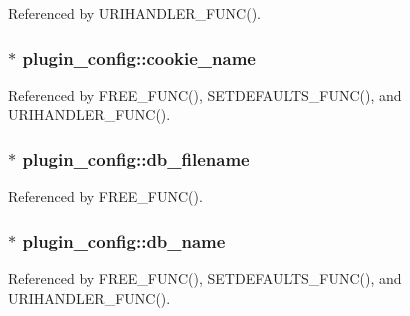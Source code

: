 Referenced by U\-R\-I\-H\-A\-N\-D\-L\-E\-R\-\_\-\-F\-U\-N\-C().

\hypertarget{structplugin__config_a32aab911a89b50b49652cfc7adcebb3c}{
\subsubsection[{cookie\-\_\-name}]{$\ast$ plugin\-\_\-config\-::cookie\-\_\-name}}\label{structplugin__config_a32aab911a89b50b49652cfc7adcebb3c}


Referenced by F\-R\-E\-E\-\_\-\-F\-U\-N\-C(), S\-E\-T\-D\-E\-F\-A\-U\-L\-T\-S\-\_\-\-F\-U\-N\-C(), and U\-R\-I\-H\-A\-N\-D\-L\-E\-R\-\_\-\-F\-U\-N\-C().

\hypertarget{structplugin__config_ad9b213b7075614a9e16ea2fe01616417}{
\subsubsection[{db\-\_\-filename}]{$\ast$ plugin\-\_\-config\-::db\-\_\-filename}}\label{structplugin__config_ad9b213b7075614a9e16ea2fe01616417}


Referenced by F\-R\-E\-E\-\_\-\-F\-U\-N\-C().

\hypertarget{structplugin__config_a4ce145b0e0b00606d2a9c8e785aaf847}{
\subsubsection[{db\-\_\-name}]{$\ast$ plugin\-\_\-config\-::db\-\_\-name}}\label{structplugin__config_a4ce145b0e0b00606d2a9c8e785aaf847}


Referenced by F\-R\-E\-E\-\_\-\-F\-U\-N\-C(), S\-E\-T\-D\-E\-F\-A\-U\-L\-T\-S\-\_\-\-F\-U\-N\-C(), and U\-R\-I\-H\-A\-N\-D\-L\-E\-R\-\_\-\-F\-U\-N\-C().

